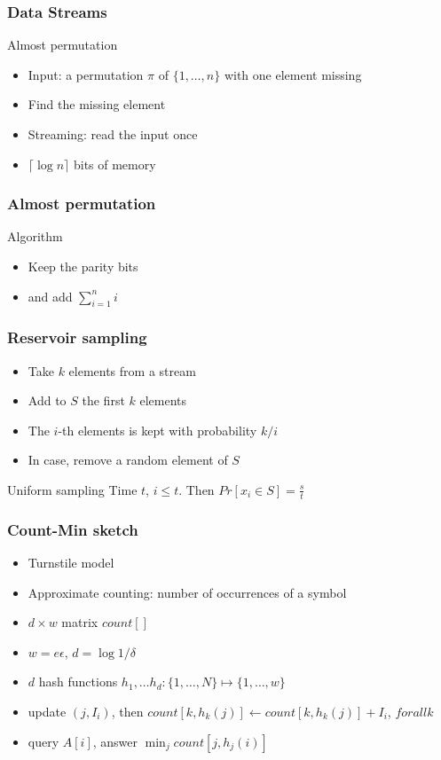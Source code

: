 \documentclass[12pt,aspectratio=169]{beamer}
\begin{document}
\begin{frame}\frametitle{Data Streams}
  \begin{block}{Almost permutation}
    \begin{itemize}
    \item
      Input: a permutation $\pi$ of $\{1, \ldots , n\}$ with one element missing
    \item
      Find the missing element
    \item
      Streaming: read the input once
    \item
      $\lceil \log n \rceil$ bits of memory
    \end{itemize}
  \end{block}
\end{frame}  

\begin{frame}\frametitle{Almost permutation}
  \begin{block}{Algorithm}
    \begin{itemize}
    \item
      Keep the parity bits
    \item
      and add $\sum_{i=1}^{n} i$
    \end{itemize}
  \end{block}
\end{frame}

\begin{frame}\frametitle{Reservoir sampling}
  \begin{itemize}
  \item
    Take $k$ elements from a stream
  \item
    Add to $S$ the first $k$ elements
  \item
    The $i$-th elements is kept with probability $k/i$
  \item
    In case, remove a random element of $S$
  \end{itemize}
  \begin{block}{Uniform sampling}
    Time $t$, $i\le t$.
%
    Then $Pr[x_{i}\in S] = \frac{s}{t}$
  \end{block}
\end{frame}

\begin{frame}\frametitle{Count-Min sketch}
  \begin{itemize}
    \item
      Turnstile model
    \item
    Approximate counting: number of occurrences of a symbol
  \item
    $d\times w$ matrix  $count[]$
  \item
    $w=e\epsilon$, $d=\log 1/\delta$
  \item
    $d$ hash functions $h_{1}, \ldots h_{d}: \{1, \ldots, N\}\mapsto \{1, \ldots , w\}$
  \item
    update $(j, I_{i})$, then $count[k, h_{k}(j)] \gets count[k, h_{k}(j)] + I_{i}$,
    $forall k$
  \item
    query $A[i]$, answer $\min_{j} count[j, h_{j}(i)]$
  \end{itemize}
\end{frame}
\end{document}
